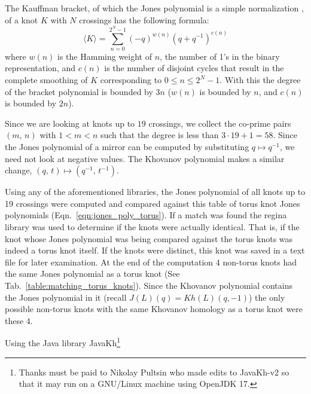 \documentclass{article}
\theoremstyle{plain}
\begin{document}
        The Kauffman bracket, of which the Jones polynomial is a simple
        normalization \cite{barnatan2002khovanov},
        of a knot $K$ with $N$ crossings has the following formula:
        \begin{equation}
            \langle{K}\rangle=\sum_{n=0}^{2^{N}-1}(-q)^{w(n)}(q+q^{-1})^{c(n)}
        \end{equation}
        where $w(n)$ is the Hamming weight of $n$, the number of 1's in the
        binary representation, and $c(n)$ is the number of disjoint cycles
        that result in the complete smoothing of $K$ corresponding to
        $0\leq{n}\leq{2}^{N}-1$. With this the degree of the bracket polynomial
        is bounded by $3n$ ($w(n)$ is bounded by $n$, and $c(n)$ is bounded
        by $2n$).
        \par\hfill\par
        Since we are looking at knots up to $19$ crossings, we collect the
        co-prime pairs $(m,\,n)$ with $1<m<n$ such that the degree
        is less than $3\cdot{19}+1=58$. Since the Jones polynomial of a mirror
        can be computed by substituting $q\mapsto{q}^{-1}$, we need not look at
        negative values. The Khovanov polynomial makes a similar change,
        $(q,\,t)\mapsto(q^{-1},\,t^{-1})$.
        \par\hfill\par
        Using any of the aforementioned libraries, the Jones polynomial of all
        knots up to 19 crossings were computed and compared against this table
        of torus knot Jones polynomials (Eqn.~\ref{eqn:jones_poly_torus}).
        If a match was found the regina library was used to determine if the
        knots were actually identical. That is, if the knot whose Jones
        polynomial was being compared against the torus knots was indeed a
        torus knot itself. If the knots were distinct, this knot was saved in a
        text file for later examination. At the end of the computation 4
        non-torus knots had the same Jones polynomial as a torus knot
        (See Tab.~\ref{table:matching_torus_knots}).
        Since the Khovanov polynomial contains the Jones polynomial in it
        (recall $J(L)(q)=Kh(L)(q,-1)$) the only possible non-torus knots with
        the same Khovanov homology as a torus knot were these 4.
        \par\hfill\par
        Using the Java library JavaKh\footnote{%
            Thanks must be paid to Nikolay Pultsin who made edits to
            JavaKh-v2 so that it may run on a GNU/Linux machine using
            OpenJDK 17.
        }
\end{document}
